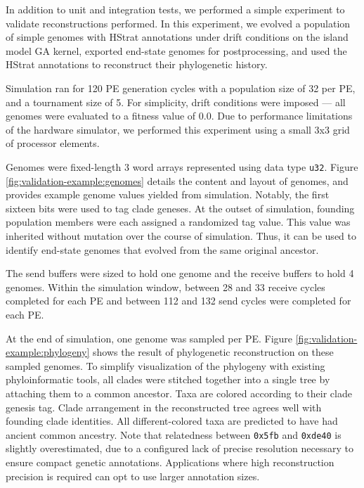 In addition to unit and integration tests, we performed a simple experiment to validate reconstructions performed.
In this experiment, we evolved a population of simple genomes with HStrat annotations under drift conditions on the island model GA kernel, exported end-state genomes for postprocessing, and used the HStrat annotations to reconstruct their phylogenetic history.

Simulation ran for 120 PE generation cycles with a population size of 32 per PE, and a tournament size of 5.
For simplicity, drift conditions were imposed --- all genomes were evaluated to a fitness value of 0.0.
Due to performance limitations of the hardware simulator, we performed this experiment using a small 3x3 grid of processor elements.

Genomes were fixed-length 3 word arrays represented using data type \texttt{u32}.
Figure \ref{fig:validation-example:genomes} details the content and layout of genomes, and provides example genome values yielded from simulation.
Notably, the first sixteen bits were used to tag clade geneses.
At the outset of simulation, founding population members were each assigned a randomized tag value.
This value was inherited without mutation over the course of simulation.
Thus, it can be used to identify end-state genomes that evolved from the same original ancestor.

The send buffers were sized to hold one genome and the receive buffers to hold 4 genomes.
Within the simulation window, between 28 and 33 receive cycles completed for each PE and between 112 and 132 send cycles were completed for each PE.



At the end of simulation, one genome was sampled per PE.
Figure \ref{fig:validation-example:phylogeny} shows the result of phylogenetic reconstruction on these sampled genomes.
To simplify visualization of the phylogeny with existing phyloinformatic tools, all clades were stitched together into a single tree by attaching them to a common ancestor.
Taxa are colored according to their clade genesis tag.
Clade arrangement in the reconstructed tree agrees well with founding clade identities.
All different-colored taxa are predicted to have had ancient common ancestry.
Note that relatedness between \texttt{0x5fb} and \texttt{0xde40} is slightly overestimated, due to a configured lack of precise resolution necessary to ensure compact genetic annotations.
Applications where high reconstruction precision is required can opt to use larger annotation sizes.


